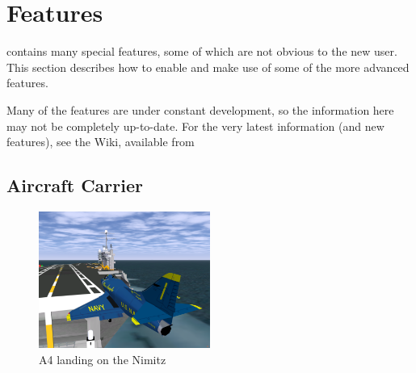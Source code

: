 
\chapter{Features\label{features}}

\FlightGear{} contains many special features, some of which are not obvious to the new user. This section
describes how to enable and make use of some of the more advanced features. 

Many of the features are under constant development, so the information here may not be completely up-to-date.
For the very latest information (and new features), see the \FlightGear{} Wiki, available from

\noindent
{}

\section{Aircraft Carrier}

\begin{figure}[!htp]
\centering
\includegraphics[width=0.5\textwidth]{img/carrier}
\caption{A4 landing on the Nimitz\label{carrier}}
\end{figure}


